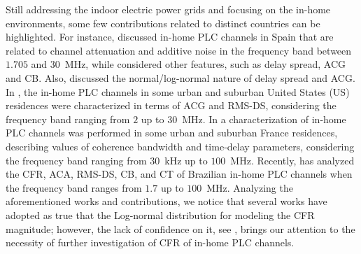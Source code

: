 \documentclass[journal]{IEEEtran}
\begin{document}
Still addressing the indoor electric power grids and focusing on the in-home environments, some few contributions related to distinct countries can be highlighted. For instance, \cite{Canete:Model} discussed in-home \ac{PLC} channels in Spain that are related to channel attenuation and additive noise in the frequency band between $1.705$ and $30$~MHz, while \cite{Canete:PLC} considered other features, such as delay spread, \ac{ACG} and \ac{CB}. Also, \cite{Cortes:PLC} discussed the normal/log-normal nature of delay spread and \ac{ACG}. In \cite{GalliUS,Galli:Wireline}, the in-home \ac{PLC} channels in some urban and suburban United States (US) residences were characterized in terms of \ac{ACG} and \ac{RMS-DS}, considering the frequency band ranging from $2$ up to $30$~MHz. In \cite{Tlich:Indoor} a characterization of in-home \ac{PLC} channels was performed in some urban and suburban France residences, describing values of coherence bandwidth and time-delay parameters, considering the frequency band ranging from $30$~kHz up to $100$~MHz. Recently, \cite{Thiago:Characterization} has analyzed the \ac{CFR}, \ac{ACA}, \ac{RMS-DS}, \ac{CB}, and \ac{CT} of Brazilian in-home \ac{PLC} channels when the frequency band ranges from $1.7$ up to $100$~MHz. Analyzing the aforementioned works and contributions, we notice that several works have adopted as true that the Log-normal distribution for modeling the \ac{CFR} magnitude; however, the lack of confidence on it, see \cite{Cortes:PLC}, brings our attention to the necessity of further investigation of \ac{CFR} of in-home \ac{PLC} channels. 
\end{document}
